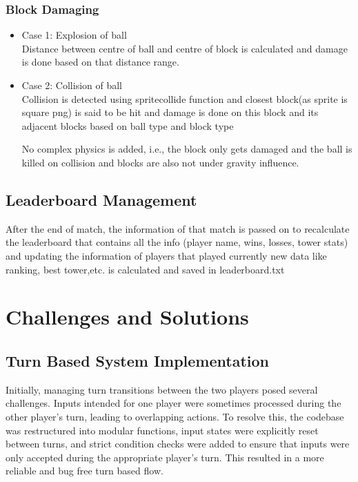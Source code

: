 \documentclass[10.5pt]{article}
\begin{document}
\subsubsection{Block Damaging}
\begin{itemize}
    \item Case 1: Explosion of ball \\
    Distance between centre of ball and centre of block is calculated and damage is done based on that distance range.
    \item Case 2: Collision of ball \\
    Collision is detected using spritecollide function and closest block(as sprite is square png) is said to be hit and damage is done on this block and its adjacent blocks based on ball type and block type

    No complex physics is added, i.e., the block only gets damaged and the ball is killed on collision and blocks are also not under gravity influence.
\end{itemize}

\subsection{Leaderboard Management}
After the end of match, the information of that match is passed on to recalculate the leaderboard that contains all the info (player name, wins, losses, tower stats) and updating the information of players that played currently new data like ranking, best tower,etc. is calculated and saved in leaderboard.txt 

\section{Challenges and Solutions}

\subsection{Turn Based System Implementation}
Initially, managing turn transitions between the two players posed several challenges. Inputs intended for one player were sometimes processed during the other player's turn, leading to overlapping actions. To resolve this, the codebase was restructured into modular functions, input states were explicitly reset between turns, and strict condition checks were added to ensure that inputs were only accepted during the appropriate player's turn. This resulted in a more reliable and bug free turn based flow.
\end{document}
